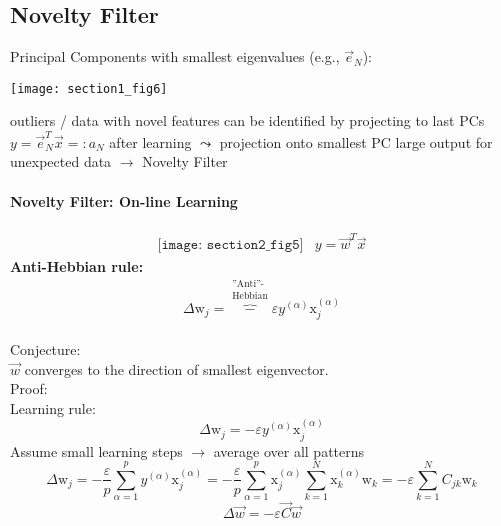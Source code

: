 \subsection{Novelty Filter}
Principal Components with smallest eigenvalues (e.g., $\vec e_N$):
\begin{center}
 \texttt{[image: section1\_fig6]} 
\end{center}
\begin{itemize}
        \itl outliers / data with novel features can be identified by projecting to last PCs
        \itl $y = \vec{e}_N^T \vec{x} =: a_N$ after learning $\leadsto$ projection onto smallest PC
        \itl large output for unexpected data $\rightarrow$ Novelty Filter
\end{itemize}

\paragraph{Novelty Filter: On-line Learning}
	\[ \begin{array}{ll}
	\texttt{[image: section2\_fig5]}
	& y = \vec{w}^T \vec{x}
	\end{array} \]
\textbf{Anti-Hebbian rule:} \\
\begin{equation}
				\Delta \mathrm{w}_j = \overbrace{-}^{\substack{	\text{''Anti''-} \\ \text{Hebbian} }} \varepsilon y^{(\alpha)} \mathrm{x}_j^{(\alpha)}
\end{equation}\\

Conjecture:\\ 
$\vec{w}$ converges to the direction of smallest eigenvector.\\
Proof:\\
Learning rule:
		\begin{equation}
		\Delta \mathrm{w}_j = - \varepsilon y^{(\alpha)} \mathrm{x}_j^{(\alpha)}
		\end{equation}
		Assume small learning steps $\rightarrow$ average over all patterns 
		\begin{equation}
			\Delta \mathrm{w}_j = - \frac{\varepsilon}{p} \sum_{\alpha = 1}^{p} y^{(\alpha)} \mathrm{x}_j^{(\alpha)} = - \frac{\varepsilon}{p} \sum_{\alpha = 1}^{p} \mathrm{x}_j^{(\alpha)} \sum_{k=1}^{N} \mathrm{x}_k^{(\alpha)} \mathrm{w}_k = - \varepsilon \sum_{k=1}^{N} C_{jk} \mathrm{w}_k 
		\end{equation}
		\begin{equation}
			\Delta \vec{w} = - \varepsilon \vec{C} \vec{w}
		\end{equation}

